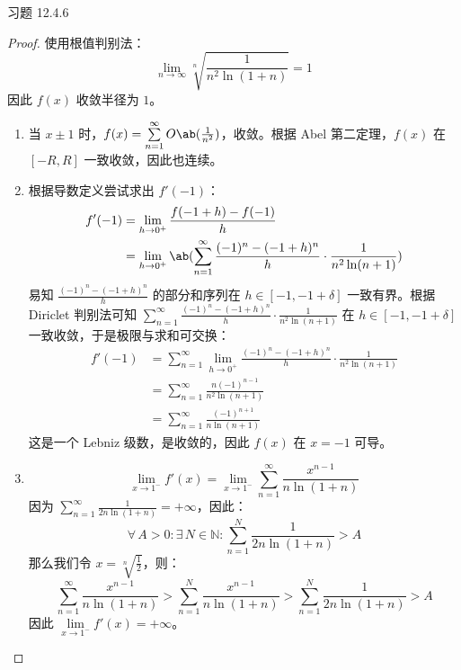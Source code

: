 \begin{problem}
    习题 12.4.6
    \begin{proof}
        使用根值判别法：
        $$
        \lim_{n \to \infty} \sqrt[n]{\frac{1}{n^2 \ln (1 + n)}} = 1
        $$
        因此 $f(x)$ 收敛半径为 $1$。

        \begin{enumerate}
            \item[\textbf{1)}] 当 $x \pm 1$ 时，$f(x) = \sum\limits_{n = 1}^{\infty} O\ab(\frac{1}{n^2})$，收敛。根据 Abel 第二定理，$f(x)$ 在 $[-R, R]$ 一致收敛，因此也连续。
            
            \item[\textbf{2)}] 根据导数定义尝试求出 $f'(-1)$：
            $$
            \begin{aligned}
                f'(-1) & = \lim_{h \to 0^+} \frac{f(-1 + h) - f(-1)}{h} \\
                & = \lim_{h \to 0^+} \ab(\sum_{n = 1}^{\infty} \frac{(-1)^{n} - (-1 + h)^{n}}{h} \cdot \frac{1}{n^2 \ln (n + 1)}) \\
            \end{aligned}
            $$
            易知 $\frac{(-1)^{n} - (-1 + h)^{n}}{h}$ 的部分和序列在 $h \in [-1, -1 + \delta]$ 一致有界。根据 Diriclet 判别法可知 $\sum\limits_{n = 1}^{\infty} \frac{(-1)^{n} - (-1 + h)^{n}}{h} \cdot \frac{1}{n^2 \ln (n + 1)}$ 在 $h \in [-1, -1 + \delta]$ 一致收敛，于是极限与求和可交换：
            $$
            \begin{aligned}
                f'(-1) & = \sum_{n = 1}^{\infty} \lim_{h \to 0^+} \frac{(-1)^{n} - (-1 + h)^{n}}{h} \cdot \frac{1}{n^2 \ln (n + 1)} \\
                & = \sum_{n = 1}^{\infty} \frac{n (-1)^{n - 1}}{n^2 \ln (n + 1)} \\
                & = \sum_{n = 1}^{\infty} \frac{(-1)^{n + 1}}{n \ln (n + 1)}
            \end{aligned}
            $$
            这是一个 Lebniz 级数，是收敛的，因此 $f(x)$ 在 $x = -1$ 可导。

            \item[\textbf{3)}]
            $$
            \lim_{x \to 1^-} f'(x) = \lim_{x \to 1^-} \sum_{n = 1}^{\infty} \frac{x^{n - 1}}{n \ln (1 + n)}
            $$
            因为 $\sum\limits_{n = 1}^{\infty} \frac{1}{2 n \ln (1 + n)} = +\infty$，因此：
            $$
            \forall\,A > 0: \exists\,N \in \mathbb{N}: \sum_{n = 1}^{N} \frac{1}{2 n \ln (1 + n)} > A            
            $$
            那么我们令 $x = \sqrt[n]{\frac{1}{2}}$，则：
            $$
            \sum_{n = 1}^{\infty} \frac{x^{n - 1}}{n \ln (1 + n)} > \sum_{n = 1}^{N} \frac{x^{n - 1}}{n \ln (1 + n)} > \sum_{n = 1}^{N} \frac{1}{2 n \ln (1 + n)} > A
            $$
            因此 $\lim\limits_{x \to 1^-} f'(x) = +\infty$。


\end{enumerate}
\end{proof}
\end{problem}
